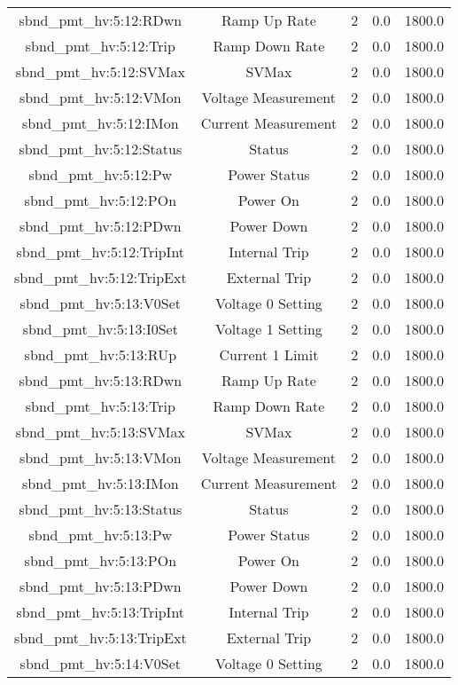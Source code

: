 \begin{center}
\begin{longtable}{c | c c c c }
sbnd\_pmt\_hv:5:12:RDwn & Ramp Up Rate & 2 & 0.0 & 1800.0\\ 
sbnd\_pmt\_hv:5:12:Trip & Ramp Down Rate & 2 & 0.0 & 1800.0\\ 
sbnd\_pmt\_hv:5:12:SVMax & SVMax & 2 & 0.0 & 1800.0\\ 
sbnd\_pmt\_hv:5:12:VMon & Voltage Measurement & 2 & 0.0 & 1800.0\\ 
sbnd\_pmt\_hv:5:12:IMon & Current Measurement & 2 & 0.0 & 1800.0\\ 
sbnd\_pmt\_hv:5:12:Status & Status & 2 & 0.0 & 1800.0\\ 
sbnd\_pmt\_hv:5:12:Pw & Power Status & 2 & 0.0 & 1800.0\\ 
sbnd\_pmt\_hv:5:12:POn & Power On & 2 & 0.0 & 1800.0\\ 
sbnd\_pmt\_hv:5:12:PDwn & Power Down & 2 & 0.0 & 1800.0\\ 
sbnd\_pmt\_hv:5:12:TripInt & Internal Trip & 2 & 0.0 & 1800.0\\ 
sbnd\_pmt\_hv:5:12:TripExt & External Trip & 2 & 0.0 & 1800.0\\ 
sbnd\_pmt\_hv:5:13:V0Set & Voltage 0 Setting & 2 & 0.0 & 1800.0\\ 
sbnd\_pmt\_hv:5:13:I0Set & Voltage 1 Setting & 2 & 0.0 & 1800.0\\ 
sbnd\_pmt\_hv:5:13:RUp & Current 1 Limit & 2 & 0.0 & 1800.0\\ 
sbnd\_pmt\_hv:5:13:RDwn & Ramp Up Rate & 2 & 0.0 & 1800.0\\ 
sbnd\_pmt\_hv:5:13:Trip & Ramp Down Rate & 2 & 0.0 & 1800.0\\ 
sbnd\_pmt\_hv:5:13:SVMax & SVMax & 2 & 0.0 & 1800.0\\ 
sbnd\_pmt\_hv:5:13:VMon & Voltage Measurement & 2 & 0.0 & 1800.0\\ 
sbnd\_pmt\_hv:5:13:IMon & Current Measurement & 2 & 0.0 & 1800.0\\ 
sbnd\_pmt\_hv:5:13:Status & Status & 2 & 0.0 & 1800.0\\ 
sbnd\_pmt\_hv:5:13:Pw & Power Status & 2 & 0.0 & 1800.0\\ 
sbnd\_pmt\_hv:5:13:POn & Power On & 2 & 0.0 & 1800.0\\ 
sbnd\_pmt\_hv:5:13:PDwn & Power Down & 2 & 0.0 & 1800.0\\ 
sbnd\_pmt\_hv:5:13:TripInt & Internal Trip & 2 & 0.0 & 1800.0\\ 
sbnd\_pmt\_hv:5:13:TripExt & External Trip & 2 & 0.0 & 1800.0\\ 
sbnd\_pmt\_hv:5:14:V0Set & Voltage 0 Setting & 2 & 0.0 & 1800.0\\ 

\end{longtable}
\end{center}
